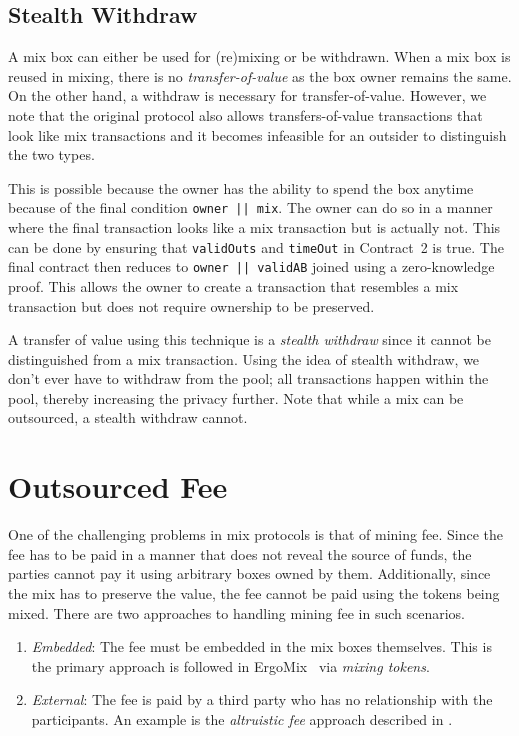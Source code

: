 \documentclass[runningheads]{llncs}
\newcommand{\ergomix}{ErgoMix\xspace}
\begin{document}
\subsection{Stealth Withdraw}
\label{stealth-withdraw}
A mix box can either be used for (re)mixing or be withdrawn. When a mix box is reused in mixing, there is no {\em transfer-of-value} as the box owner remains the same. On the other hand, a withdraw is necessary for transfer-of-value. However, we note that the original protocol also allows transfers-of-value transactions that look like mix transactions and it becomes infeasible for an outsider to distinguish the two types.

This is possible because the owner has the ability to spend the box anytime because of the final condition \texttt{owner || mix}. The owner can do so in a manner where the final transaction looks like a mix transaction but is actually not.
This can be done by ensuring that \texttt{validOuts} and \texttt{timeOut} in Contract~2 is true.
The final contract then reduces to \texttt{owner || validAB} joined using a zero-knowledge proof.
This allows the owner to create a transaction that resembles a mix transaction but does not require ownership to be preserved.

A transfer of value using this technique is a {\em stealth withdraw} since it cannot be distinguished from a mix transaction.
Using the idea of stealth withdraw, we don't ever have to withdraw from the pool;
all transactions happen within the pool, thereby increasing the privacy further.
Note that while a mix can be outsourced, a stealth withdraw cannot.

\section{Outsourced Fee}

One of the challenging problems in mix protocols is that of mining fee. Since the fee has to be paid in a manner that does not reveal the source of funds, the parties cannot pay it using arbitrary boxes owned by them. Additionally, since the mix has to preserve the value, the fee cannot be paid using the tokens being mixed. There are two approaches to handling mining fee in such scenarios.
\begin{enumerate}
\item {\em Embedded}: The fee must be embedded in the mix boxes themselves. This is the primary approach is followed in \ergomix~\cite{zerojoin} via {\em mixing tokens}.
\item {\em External}: The fee is paid by a third party who has no relationship with the participants. An example is the {\em altruistic fee} approach described in \cite{zerojoin}.
\end{enumerate}
\end{document}
